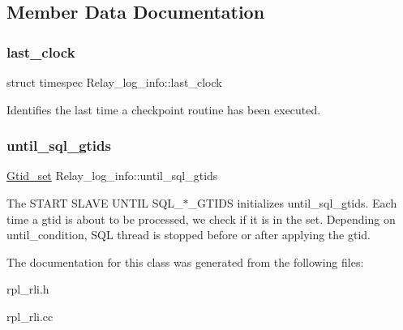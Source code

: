 \subsection{Member Data Documentation}
\mbox{\label{classRelay__log__info_a2a6610b50302ab38599e82bda93c53ce}} 
\subsubsection{\texorpdfstring{last\+\_\+clock}{last\_clock}}
{\footnotesize\ttfamily struct timespec Relay\+\_\+log\+\_\+info\+::last\+\_\+clock}

Identifies the last time a checkpoint routine has been executed. \mbox{\label{classRelay__log__info_a2f838f8d82a97c44226b63f35862616a}} 
\subsubsection{\texorpdfstring{until\+\_\+sql\+\_\+gtids}{until\_sql\_gtids}}
{\footnotesize\ttfamily \mbox{\hyperlink{classGtid__set}{Gtid\+\_\+set}} Relay\+\_\+log\+\_\+info\+::until\+\_\+sql\+\_\+gtids}

The S\+T\+A\+RT S\+L\+A\+VE U\+N\+T\+IL S\+Q\+L\+\_\+$\ast$\+\_\+\+G\+T\+I\+DS initializes until\+\_\+sql\+\_\+gtids. Each time a gtid is about to be processed, we check if it is in the set. Depending on until\+\_\+condition, S\+QL thread is stopped before or after applying the gtid. 

The documentation for this class was generated from the following files\+:\begin{DoxyCompactItemize}
\item 
rpl\+\_\+rli.\+h\item 
rpl\+\_\+rli.\+cc\end{DoxyCompactItemize}
